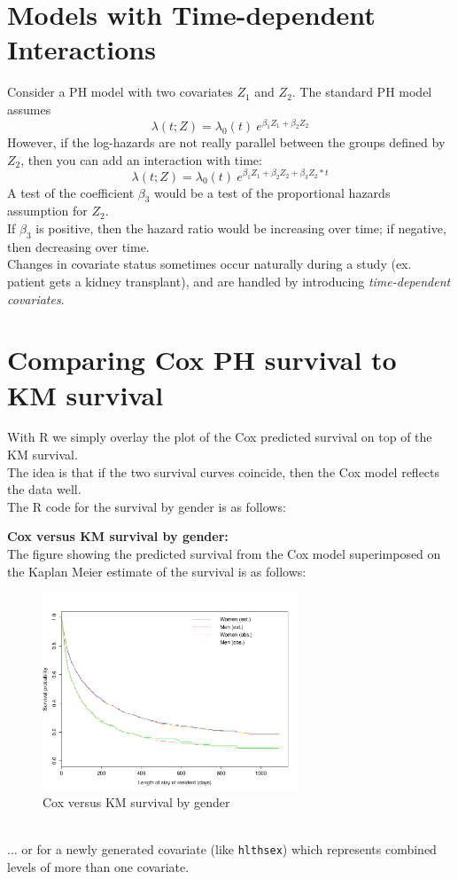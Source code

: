 \documentclass[11pt,psfig]{book}
\begin{document}
\section{Models with Time-dependent Interactions}
Consider a PH model with two covariates $Z_1$ and $Z_2$.
The standard PH model assumes
\[   \lambda(t; Z)  = \lambda_0(t) ~ e^{\beta_1 Z_1 + \beta_2 Z_2} \]
However, if the log-hazards are not really parallel
between the groups defined by $Z_2$, then
you can add an interaction with time:
\[   \lambda(t; Z)  = \lambda_0(t) ~ e^{\beta_1 Z_1 + \beta_2 Z_2
    + \beta_3 Z_2*t} \]
A test of the coefficient $\beta_3$ would be a test of the
proportional hazards assumption for $Z_2$.
\\[2ex]
If $\beta_3$ is positive, then the hazard ratio would be increasing
over time; if negative, then decreasing over time.
\\[2ex]
Changes in covariate status sometimes occur naturally during
a study (ex. patient gets a kidney transplant), and are handled by
introducing {\em time-dependent covariates}.
\section{Comparing Cox PH survival to KM survival}
With R we simply overlay the plot of the Cox predicted survival on top of the KM survival.\\[2ex]
The idea is that if the two survival curves coincide, then the Cox model reflects the data well.
\\[2ex]
The R code for the survival by gender is as follows:

{\bf Cox versus KM survival by gender:}
\\[2ex]
The figure showing the predicted survival from the Cox model superimposed on the Kaplan Meier estimate of the survival is as follows:
\begin{figure}[htp]
\caption{Cox versus KM survival by gender}
\centerline{\includegraphics[width=3in]{ch12kmph_sex.pdf}}
\end{figure}
~\\[2ex]
... or for a newly generated covariate (like {\tt hlthsex}) which represents combined
levels of more than one covariate.
\end{document}
